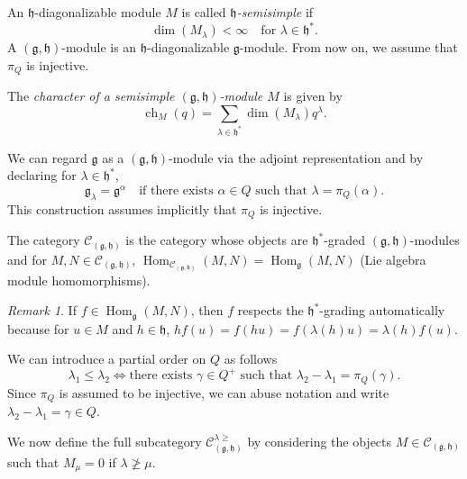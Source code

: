\documentclass[a4paper, 12pt, reqno]{amsart}
\theoremstyle{remark}
\newtheorem{remark}[theorem]{Remark}
\DeclareMathOperator{\ch}{ch}
\DeclareMathOperator{\Hom}{Hom}
\begin{document}
An $\mathfrak{h}$-diagonalizable module $M$ is called \emph{$\mathfrak{h}$-semisimple} if
\begin{equation*}
  \dim(M_{\lambda}) < \infty \quad \text{for $\lambda \in \mathfrak{h}^*$}.
\end{equation*}
A $(\mathfrak{g}, \mathfrak{h})$-module is an $\mathfrak{h}$-diagonalizable $\mathfrak{g}$-module.
From now on, we assume that $\pi_Q$ is injective.

The \emph{character of a semisimple $(\mathfrak{g}, \mathfrak{h})$-module $M$} is given by
\begin{equation*}
  \ch_M(q) = \sum_{\lambda \in \mathfrak{h}^*}\dim(M_{\lambda})q^{\lambda}.
\end{equation*}

We can regard $\mathfrak{g}$ as a $(\mathfrak{g}, \mathfrak{h})$-module via the adjoint representation and by declaring for $\lambda \in \mathfrak{h}^*$,
\begin{equation*}
  \mathfrak{g}_{\lambda} = \mathfrak{g}^{\alpha} \quad \text{if there exists $\alpha \in Q$ such that $\lambda = \pi_Q(\alpha)$}.
\end{equation*}
This construction assumes implicitly that $\pi_Q$ is injective.

The category $\mathcal{C}_{(\mathfrak{g}, \mathfrak{h})}$ is the category whose objects are $\mathfrak{h}^*$-graded $(\mathfrak{g}, \mathfrak{h})$-modules and for $M, N \in \mathcal{C}_{(\mathfrak{g}, \mathfrak{h})}$, $\Hom_{\mathcal{C}_{(\mathfrak{g}, \mathfrak{h})}}(M, N) = \Hom_{\mathfrak{g}}(M, N)$ (Lie algebra module homomorphisms).

\begin{remark}
  \label{rmk:1}
  If $f \in \Hom_{\mathfrak{g}}(M, N)$, then $f$ respects the $\mathfrak{h}^*$-grading automatically because for $u \in M$ and $h \in \mathfrak{h}$, $hf(u) = f(hu) = f(\lambda(h)u) = \lambda(h)f(u)$.
\end{remark}

We can introduce a partial order on $Q$ as follows
\begin{equation*}
  \lambda_1 \le \lambda_2 \iff \text{there exists $\gamma \in Q^+$ such that $\lambda_2 - \lambda_1 = \pi_Q(\gamma)$.}
\end{equation*}
Since $\pi_Q$ is assumed to be injective, we can abuse notation and write $\lambda_2 - \lambda_1 = \gamma \in Q$.

We now define the full subcategory $\mathcal{C}^{\lambda \ge}_{(\mathfrak{g}, \mathfrak{h})}$ by considering the objects $M \in \mathcal{C}_{(\mathfrak{g}, \mathfrak{h})}$ such that $M_{\mu} = 0$ if $\lambda \ngeq \mu$.
\end{document}
